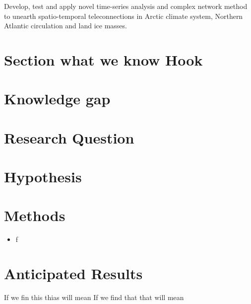 Develop, test and apply novel time-series analysis and complex network method to unearth spatio-temporal teleconnections in Arctic climate system, Northern Atlantic circulation and land ice masses.

\section{Section what we know Hook}

\section{Knowledge gap}
\section{Research Question}


\section{Hypothesis}

\section{Methods}

\begin{itemize}
    \item f
\end{itemize}

\section{Anticipated Results}

If we fin this thias will mean
If we find that that will mean